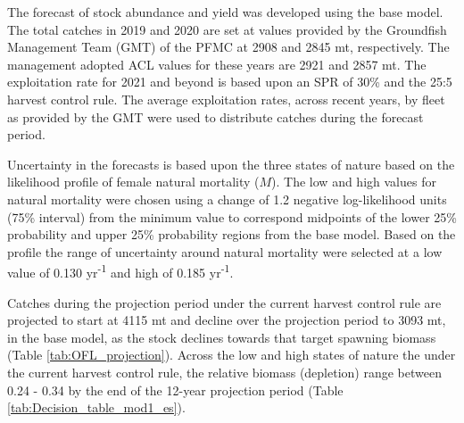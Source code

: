 \documentclass[12pt,]{article}
\begin{document}
The forecast of stock abundance and yield was developed using the base
model. The total catches in 2019 and 2020 are set at values provided by
the Groundfish Management Team (GMT) of the PFMC at 2908 and 2845 mt,
respectively. The management adopted ACL values for these years are 2921
and 2857 mt. The exploitation rate for 2021 and beyond is based upon an
SPR of 30\% and the 25:5 harvest control rule. The average exploitation
rates, across recent years, by fleet as provided by the GMT were used to
distribute catches during the forecast period.

Uncertainty in the forecasts is based upon the three states of nature
based on the likelihood profile of female natural mortality (\(M\)). The
low and high values for natural mortality were chosen using a change of
1.2 negative log-likelihood units (75\% interval) from the minimum value
to correspond midpoints of the lower 25\% probability and upper 25\%
probability regions from the base model. Based on the profile the range
of uncertainty around natural mortality were selected at a low value of
0.130 yr\textsuperscript{-1} and high of 0.185 yr\textsuperscript{-1}.

Catches during the projection period under the current harvest control
rule are projected to start at 4115 mt and decline over the projection
period to 3093 mt, in the base model, as the stock declines towards that
target spawning biomass (Table \ref{tab:OFL_projection}). Across the low
and high states of nature the under the current harvest control rule,
the relative biomass (depletion) range between 0.24 - 0.34 by the end of
the 12-year projection period (Table \ref{tab:Decision_table_mod1_es}).
\end{document}
